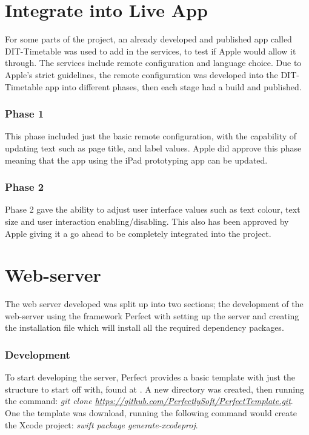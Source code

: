\section{Integrate into Live App} \label{dev:integration}

For some parts of the project, an already developed and published app called DIT-Timetable was used to add in the services, to test if Apple would allow it through. The services include remote configuration and language choice. Due to Apple's strict guidelines, the remote configuration was developed into the DIT-Timetable app into different phases, then each stage had a build and published.

\subsubsection{Phase 1}
This phase included just the basic remote configuration, with the capability of updating text such as page title, and label values. Apple did approve this phase meaning that the app using the iPad prototyping app can be updated.

\subsubsection{Phase 2}

Phase 2 gave the ability to adjust user interface values such as text colour, text size and user interaction enabling/disabling. This also has been approved by Apple giving it a go ahead to be completely integrated into the project.

\section{Web-server} \label{dev:webserver}

The web server developed was split up into two sections; the development of the web-server using the framework Perfect with setting up the server and creating the installation file which will install all the required dependency packages.

\subsubsection{Development} \label{dev:ws_dev}

To start developing the server, Perfect provides a basic template with just the structure to start off with, found at . A new directory was created, then running the command: \textit{git clone \url{https://github.com/PerfectlySoft/PerfectTemplate.git}}. One the template was download, running the following command would create the Xcode project: \textit{swift package generate-xcodeproj}. 

